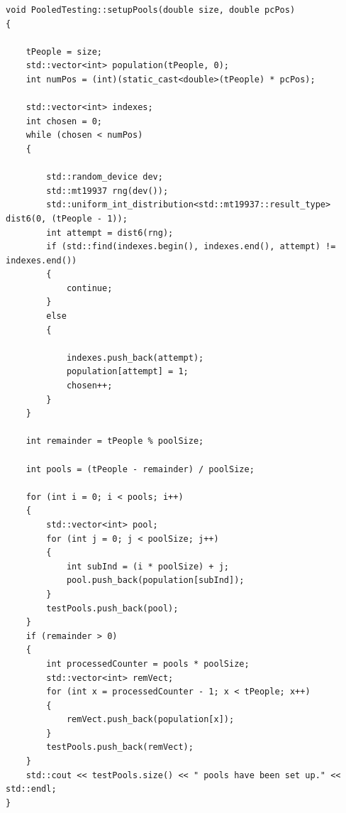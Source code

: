 \documentclass[letterpaper, 10pt]{article}
\begin{document}
 \begin{addmargin}[-5em]{1em}
\begin{small}
\begin{verbatim}
void PooledTesting::setupPools(double size, double pcPos)
{

    tPeople = size;
    std::vector<int> population(tPeople, 0);
    int numPos = (int)(static_cast<double>(tPeople) * pcPos);

    std::vector<int> indexes;
    int chosen = 0;
    while (chosen < numPos)
    {

        std::random_device dev; 
        std::mt19937 rng(dev());
        std::uniform_int_distribution<std::mt19937::result_type> dist6(0, (tPeople - 1));
        int attempt = dist6(rng);
        if (std::find(indexes.begin(), indexes.end(), attempt) != indexes.end())
        {
            continue;
        }
        else
        {

            indexes.push_back(attempt);
            population[attempt] = 1;
            chosen++;
        }
    }

    int remainder = tPeople % poolSize;

    int pools = (tPeople - remainder) / poolSize;

    for (int i = 0; i < pools; i++)
    {
        std::vector<int> pool;
        for (int j = 0; j < poolSize; j++)
        {
            int subInd = (i * poolSize) + j;
            pool.push_back(population[subInd]);
        }
        testPools.push_back(pool);
    }
    if (remainder > 0)
    {
        int processedCounter = pools * poolSize;
        std::vector<int> remVect;
        for (int x = processedCounter - 1; x < tPeople; x++)
        {
            remVect.push_back(population[x]);
        }
        testPools.push_back(remVect);
    }
    std::cout << testPools.size() << " pools have been set up." << std::endl;
}
\end{verbatim}
\end{small}
\end{addmargin}
\end{document}
